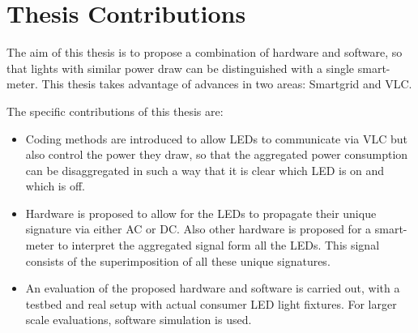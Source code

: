 

\section{Thesis Contributions}

The aim of this thesis is to propose a combination of hardware and software, so that lights with similar power draw can be distinguished with a single smart-meter.
This thesis takes advantage of advances in two areas: Smartgrid and VLC.

The specific contributions of this thesis are:

\begin{itemize}
	\item Coding methods are introduced to allow LEDs to communicate via VLC but also control the power they draw, so that the aggregated power consumption can be disaggregated in such a way that it is clear which LED is on and which is off.

	\item Hardware is proposed to allow for the LEDs to propagate their unique signature via either AC or DC. Also other hardware is proposed for a smart-meter to interpret the aggregated signal form all the LEDs. This signal consists of the superimposition of all these unique signatures.

	\item An evaluation of the proposed hardware and software is carried out, with a testbed and real setup with actual consumer LED light fixtures. For larger scale evaluations, software simulation is used. 
\end{itemize}
